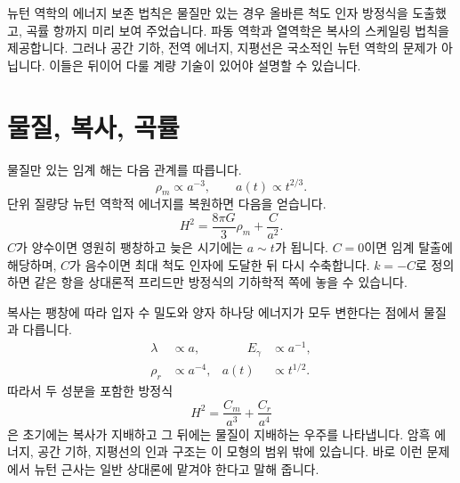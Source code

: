 \begin{classroomqa}
\end{classroomqa}

뉴턴 역학의 에너지 보존 법칙은 물질만 있는 경우 올바른 척도 인자 방정식을 도출했고, 곡률 항까지 미리 보여 주었습니다. 파동 역학과 열역학은 복사의 스케일링 법칙을 제공합니다. 그러나 공간 기하, 전역 에너지, 지평선은 국소적인 뉴턴 역학의 문제가 아닙니다. 이들은 뒤이어 다룰 계량 기술이 있어야 설명할 수 있습니다.

\section{물질, 복사, 곡률}

물질만 있는 임계 해는 다음 관계를 따릅니다.
\begin{equation}
\rho_m\propto a^{-3},
\qquad
a(t)\propto t^{2/3}.
\end{equation}
단위 질량당 뉴턴 역학적 에너지를 복원하면 다음을 얻습니다.
\begin{equation}
H^2=\frac{8\pi G}{3}\rho_m+\frac{C}{a^2}.
\end{equation}
\(C\)가 양수이면 영원히 팽창하고 늦은 시기에는 \(a\sim t\)가 됩니다. \(C=0\)이면 임계 탈출에 해당하며, \(C\)가 음수이면 최대 척도 인자에 도달한 뒤 다시 수축합니다. \(k=-C\)로 정의하면 같은 항을 상대론적 프리드만 방정식의 기하학적 쪽에 놓을 수 있습니다.

복사는 팽창에 따라 입자 수 밀도와 양자 하나당 에너지가 모두 변한다는 점에서 물질과 다릅니다.
\begin{equation}
\begin{aligned}
\lambda&\propto a,
&\qquad E_\gamma&\propto a^{-1},\\
\rho_r&\propto a^{-4},
& a(t)&\propto t^{1/2}.
\end{aligned}
\end{equation}
따라서 두 성분을 포함한 방정식
\begin{equation}
H^2=\frac{C_m}{a^3}+\frac{C_r}{a^4}
\end{equation}
은 초기에는 복사가 지배하고 그 뒤에는 물질이 지배하는 우주를 나타냅니다. 암흑 에너지, 공간 기하, 지평선의 인과 구조는 이 모형의 범위 밖에 있습니다. 바로 이런 문제에서 뉴턴 근사는 일반 상대론에 맡겨야 한다고 말해 줍니다.
